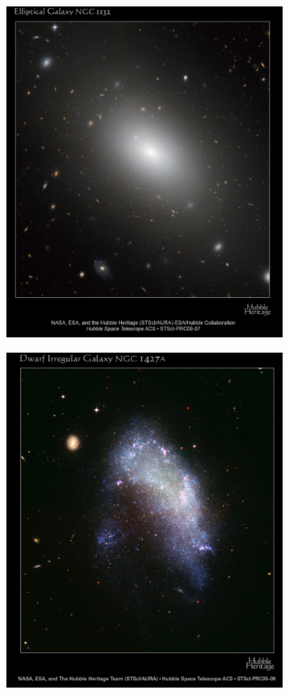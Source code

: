 \begin{figure}
\begin{subfigure}[b]{0.49\textwidth}
			\includegraphics[width=1\linewidth]{img/ch-01/ellipticalNGC1132.png}
			\caption{}
			\label{fig:ellipitcalNGC1332}
		\end{subfigure}
		\begin{subfigure}[b]{0.49\textwidth}
			\includegraphics[width=1\linewidth]{img/ch-01/dwarfirregularNGC1427A.png}

\end{subfigure}
\end{figure}
